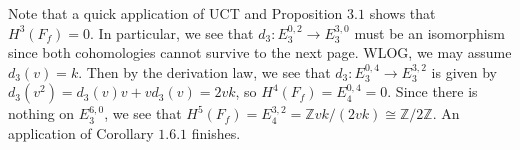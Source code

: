 \documentclass{article}
\theoremstyle{definition}
\theoremstyle{definition}
\theoremstyle{definition}
\theoremstyle{definition}
\theoremstyle{definition}
\theoremstyle{definition}
\begin{document}
Note that a quick application of UCT and Proposition $3.1$ shows that $H^3(F_f)=0$. In particular, we see that $d_3: E_3^{0,2}\to E_3^{3,0}$ must be an isomorphism since both cohomologies cannot survive to the next page. WLOG, we may assume $d_3(v)=k$. Then by the derivation law, we see that $d_3: E_3^{0,4}\to E_3^{3,2}$ is given by $d_3(v^2)=d_3(v)v+vd_3(v)=2vk$, so $H^4(F_f)=E_4^{0,4}=0$. Since there is nothing on $E_3^{6,0}$, we see that $H^5(F_f)=E_4^{3,2}=\mathbb{Z}vk/(2vk)\cong \mathbb{Z}/2 \mathbb{Z}$. An application of Corollary $1.6.1$ finishes.
\end{document}
